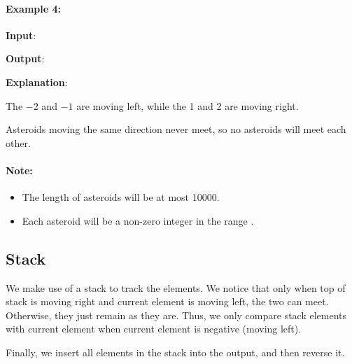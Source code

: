 \paragraph{Example 4:}
\begin{flushleft}


\textbf{Input}: 

\textbf{Output}: \fcj{[-2, -1, 1, 2]}

\textbf{Explanation}:
 
The $-2$ and $-1$ are moving left, while the 1 and 2 are moving right.

Asteroids moving the same direction never meet, so no asteroids will meet each other.
\end{flushleft}

\paragraph{Note:}
\begin{itemize}
\item The length of asteroids will be at most 10000.
\item Each asteroid will be a non-zero integer in the range \fcj{[-1000, 1000]}.
\end{itemize}

\subsection{Stack}
We make use of a stack to track the elements. We notice that only when top of stack is moving right and current element is moving left, the two can meet. Otherwise, they just remain as they are. Thus, we only compare stack elements with current element when current element is negative (moving left).

Finally, we insert all elements in the stack into the output, and then reverse it.

